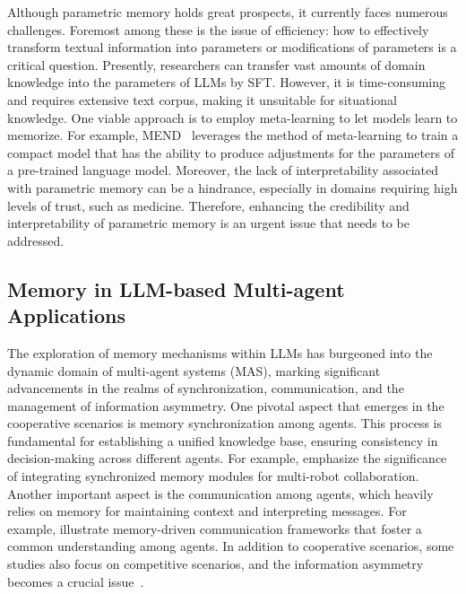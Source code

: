 \documentclass{article}
\theoremstyle{definition}
\theoremstyle{theorem}
\theoremstyle{proof}
\theoremstyle{remark}
\begin{document}
	
	Although parametric memory holds great prospects, it currently faces numerous challenges. Foremost among these is the issue of efficiency: how to effectively transform textual information into parameters or modifications of parameters is a critical question. Presently, researchers can transfer vast amounts of domain knowledge into the parameters of LLMs by SFT. However, it is time-consuming and requires extensive text corpus, making it unsuitable for situational knowledge. One viable approach is to employ meta-learning to let models learn to memorize.
	For example, MEND~\cite{mend} leverages the method of meta-learning to train a compact model that has the ability to produce adjustments for the parameters of a pre-trained language model.
	Moreover, the lack of interpretability associated with parametric memory can be a hindrance, especially in domains requiring high levels of trust, such as medicine. Therefore, enhancing the credibility and interpretability of parametric memory is an urgent issue that needs to be addressed.
	
	
	\subsection{Memory in LLM-based Multi-agent Applications}
	
	The exploration of memory mechanisms within LLMs has burgeoned into the dynamic domain of multi-agent systems (MAS), marking significant advancements in the realms of synchronization, communication, and the management of information asymmetry.
	One pivotal aspect that emerges in the cooperative scenarios is memory synchronization among agents. This process is fundamental for establishing a unified knowledge base, ensuring consistency in decision-making across different agents. For example, \citet{chen2023scalable} emphasize the significance of integrating synchronized memory modules for multi-robot collaboration.
	Another important aspect is the communication among agents, which heavily relies on memory for maintaining context and interpreting messages. For example, \citet{mandi2023roco} illustrate memory-driven communication frameworks that foster a common understanding among agents.
	In addition to cooperative scenarios, some studies also focus on competitive scenarios, and the information asymmetry becomes a crucial issue~\cite{light2023text}.
	
\end{document}
